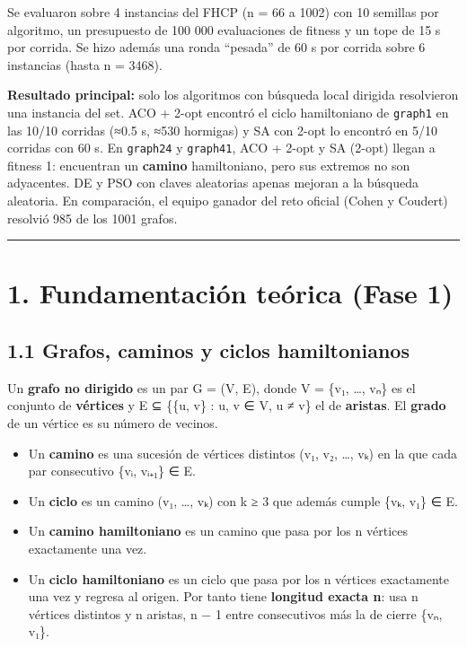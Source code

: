 \documentclass[
  spanish,
  12pt,
]{article}
\providecommand{\tightlist}{%
  \setlength{\itemsep}{0pt}\setlength{\parskip}{0pt}}
\begin{document}
Se evaluaron sobre 4 instancias del FHCP (n = 66 a 1002) con 10 semillas
por algoritmo, un presupuesto de 100 000 evaluaciones de fitness y un
tope de 15 s por corrida. Se hizo además una ronda ``pesada'' de 60 s
por corrida sobre 6 instancias (hasta n = 3468).

\textbf{Resultado principal:} solo los algoritmos con búsqueda local
dirigida resolvieron una instancia del set. ACO + 2-opt encontró el
ciclo hamiltoniano de \texttt{graph1} en las 10/10 corridas (≈0.5 s,
≈530 hormigas) y SA con 2-opt lo encontró en 5/10 corridas con 60 s. En
\texttt{graph24} y \texttt{graph41}, ACO + 2-opt y SA (2-opt) llegan a
fitness 1: encuentran un \textbf{camino} hamiltoniano, pero sus extremos
no son adyacentes. DE y PSO con claves aleatorias apenas mejoran a la
búsqueda aleatoria. En comparación, el equipo ganador del reto oficial
(Cohen y Coudert) resolvió 985 de los 1001 grafos.

\begin{center}\rule{0.5\linewidth}{0.5pt}\end{center}

\section{1. Fundamentación teórica (Fase
1)}\label{fundamentaciuxf3n-teuxf3rica-fase-1}

\subsection{1.1 Grafos, caminos y ciclos
hamiltonianos}\label{grafos-caminos-y-ciclos-hamiltonianos}

Un \textbf{grafo no dirigido} es un par G = (V, E), donde V = \{v₁,
\ldots, vₙ\} es el conjunto de \textbf{vértices} y E ⊆ \{\{u, v\} : u, v
∈ V, u ≠ v\} el de \textbf{aristas}. El \textbf{grado} de un vértice es
su número de vecinos.

\begin{itemize}
\tightlist
\item
  Un \textbf{camino} es una sucesión de vértices distintos (v₁, v₂,
  \ldots, vₖ) en la que cada par consecutivo \{vᵢ, vᵢ₊₁\} ∈ E.
\item
  Un \textbf{ciclo} es un camino (v₁, \ldots, vₖ) con k ≥ 3 que además
  cumple \{vₖ, v₁\} ∈ E.
\item
  Un \textbf{camino hamiltoniano} es un camino que pasa por los n
  vértices exactamente una vez.
\item
  Un \textbf{ciclo hamiltoniano} es un ciclo que pasa por los n vértices
  exactamente una vez y regresa al origen. Por tanto tiene
  \textbf{longitud exacta n}: usa n vértices distintos y n aristas, n −
  1 entre consecutivos más la de cierre \{vₙ, v₁\}.
\end{itemize}
\end{document}

